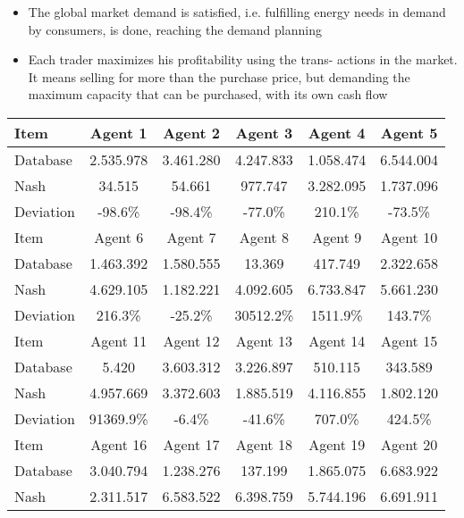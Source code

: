 \documentclass[12pt]{book}
\begin{document}
\begin{itemize}

\item{The global market demand is satisfied, i.e. fulfilling energy needs in demand by consumers, is done, reaching the demand planning} 

\item{Each trader maximizes his profitability using the trans- actions in the market. It means selling for more than the purchase price, but demanding the maximum capacity that can be purchased, with its own cash flow}

\end{itemize}

\begin{table}[htbp]
\begin{center}
\begin{tabular}{| l | c | c | c | c | c |} 
\hline
Item & Agent 1 & Agent 2 & Agent 3 & Agent 4 & Agent 5  \\
\hline \hline
Database & 2.535.978 & 3.461.280 & 4.247.833 & 1.058.474 & 6.544.004 \\ \hline
Nash & 34.515 & 54.661 & 977.747 & 3.282.095 & 1.737.096 \\ \hline
Deviation & -98.6\% & -98.4\% & -77.0\% & 210.1\% & -73.5\%  \\ \hline
\hline
Item & Agent 6 & Agent 7 & Agent 8 & Agent 9 & Agent 10 \\ \hline
\hline \hline
Database & 1.463.392 & 1.580.555 & 13.369 & 417.749 & 2.322.658 \\ \hline
Nash & 4.629.105 & 1.182.221 & 4.092.605 & 6.733.847 & 5.661.230  \\ \hline
Deviation & 216.3\% & -25.2\% & 30512.2\% & 1511.9\% & 143.7\% \\ \hline
\hline
Item & Agent 11 & Agent 12 & Agent 13 & Agent 14 & Agent 15 \\ \hline
\hline \hline
Database & 5.420 & 3.603.312 & 3.226.897 & 510.115 & 343.589 \\ \hline
Nash & 4.957.669 & 3.372.603 & 1.885.519 & 4.116.855 & 1.802.120  \\ \hline
Deviation & 91369.9\% & -6.4\% & -41.6\% & 707.0\% & 424.5\% \\ \hline
\hline
Item & Agent 16 & Agent 17 & Agent 18 & Agent 19 & Agent 20 \\ \hline
\hline \hline
Database & 3.040.794 & 1.238.276 & 137.199 & 1.865.075 & 6.683.922 \\ \hline
Nash & 2.311.517 & 6.583.522 & 6.398.759 & 5.744.196 & 6.691.911  \\ \hline

\end{tabular}
\end{center}
\end{table}
\end{document}
